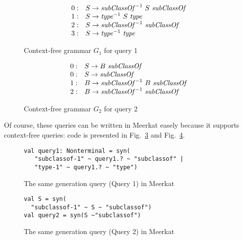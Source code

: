 \begin{figure}[h]
   \centering
   \[
\begin{array}{rl}
   0: & S \rightarrow \text{\textit{subClassOf}}^{-1} \ S \ \text{\textit{subClassOf}} \\ 
   1: & S \rightarrow \text{\textit{type}}^{-1} \ S \ \text{\textit{type}} \\ 
   2: & S \rightarrow \text{\textit{subClassOf}}^{-1} \ \text{\textit{subClassOf}} \\ 
   3: & S \rightarrow \text{\textit{type}}^{-1} \ \text{\textit{type}} \\ 
\end{array}
\]
   \caption{Context-free grammar $G_1$ for query 1}
   \label{grammarQ1}
   \end{figure}

\begin{figure}[h]
   \centering
   \[
\begin{array}{rl}
   0: & S \rightarrow B \ \text{\textit{subClassOf}} \\ 
   0: & S \rightarrow \text{\textit{subClassOf}} \\ 
   1: & B \rightarrow \text{\textit{subClassOf}}^{-1} \ B \ \text{\textit{subClassOf}} \\
   2: & B \rightarrow \text{\textit{subClassOf}}^{-1} \ \text{\textit{subClassOf}} \\ 
\end{array}
\]
   \caption{Context-free grammar $G_2$ for query 2}
   \label{grammarQ2}        
   \end{figure}

   Of course, these queries can be written in Meerkat easely because it supports context-free queries: code is presented in Fig.~\ref{fig:query1Meerkat} and Fig.~\ref{fig:query2Meerkat}.

\begin{figure}[h]
\begin{lstlisting}
val query1: Nonterminal = syn(
   "subclassof-1" ~ query1.? ~ "subclassof" |
   "type-1" ~ query1.? ~ "type")
\end{lstlisting}
\caption{The same generation query (Query 1) in Meerkat}
\label{fig:query1Meerkat}
\end{figure}


\begin{figure}[h]
\begin{lstlisting}
val S = syn(
  "subclassof-1" ~ S ~ "subclassof")
val query2 = syn(S ~"subclassof")
\end{lstlisting}
\caption{The same generation query (Query 2) in Meerkat}
\label{fig:query2Meerkat}
\end{figure}

